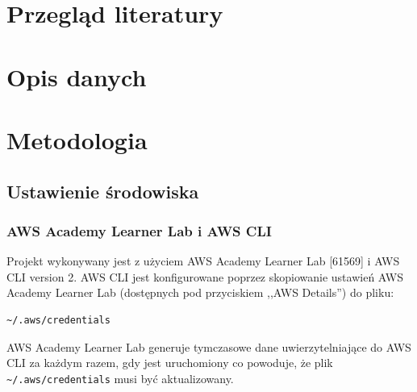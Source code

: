 \documentclass[12pt, a4paper]{article}
\begin{document}








\section{Przegląd literatury}

\section{Opis danych}


\section{Metodologia}

\subsection{Ustawienie środowiska}
\subsubsection{AWS Academy Learner Lab i AWS CLI}
Projekt wykonywany jest z użyciem AWS Academy Learner Lab [61569] i AWS CLI version 2. AWS CLI jest konfigurowane poprzez skopiowanie ustawień AWS Academy Learner Lab (dostępnych pod przyciskiem ,,AWS Details'') do  pliku:
\begin{verbatim}
~/.aws/credentials
\end{verbatim}
AWS Academy Learner Lab generuje tymczasowe dane uwierzytelniające do AWS CLI za każdym razem, gdy jest uruchomiony co powoduje, że plik \verb|~/.aws/credentials| musi być aktualizowany.
\end{document}
